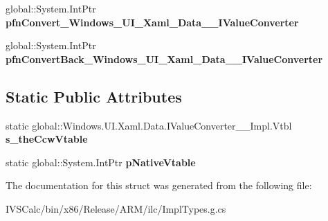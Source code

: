 \begin{DoxyCompactItemize}
global\+::\+System.\+Int\+Ptr {\bfseries pfn\+Convert\+\_\+\+Windows\+\_\+\+U\+I\+\_\+\+Xaml\+\_\+\+Data\+\_\+\+\_\+\+I\+Value\+Converter}
\item 
\mbox{\label{struct_windows_1_1_u_i_1_1_xaml_1_1_data_1_1_i_value_converter_____impl_1_1_vtbl_a53957ed401e41df616c104d30dc7a444}} 
global\+::\+System.\+Int\+Ptr {\bfseries pfn\+Convert\+Back\+\_\+\+Windows\+\_\+\+U\+I\+\_\+\+Xaml\+\_\+\+Data\+\_\+\+\_\+\+I\+Value\+Converter}
\end{DoxyCompactItemize}
\subsection*{Static Public Attributes}
\begin{DoxyCompactItemize}
\item 
\mbox{\label{struct_windows_1_1_u_i_1_1_xaml_1_1_data_1_1_i_value_converter_____impl_1_1_vtbl_abe76a5a9e5d13989356f75edcd678d26}} 
static global\+::\+Windows.\+U\+I.\+Xaml.\+Data.\+I\+Value\+Converter\+\_\+\+\_\+\+Impl.\+Vtbl {\bfseries s\+\_\+the\+Ccw\+Vtable}
\item 
\mbox{\label{struct_windows_1_1_u_i_1_1_xaml_1_1_data_1_1_i_value_converter_____impl_1_1_vtbl_ad6200659a6060cf2005e8c50cd6e30d4}} 
static global\+::\+System.\+Int\+Ptr {\bfseries p\+Native\+Vtable}
\end{DoxyCompactItemize}


The documentation for this struct was generated from the following file\+:\begin{DoxyCompactItemize}
\item 
I\+V\+S\+Calc/bin/x86/\+Release/\+A\+R\+M/ilc/Impl\+Types.\+g.\+cs\end{DoxyCompactItemize}
